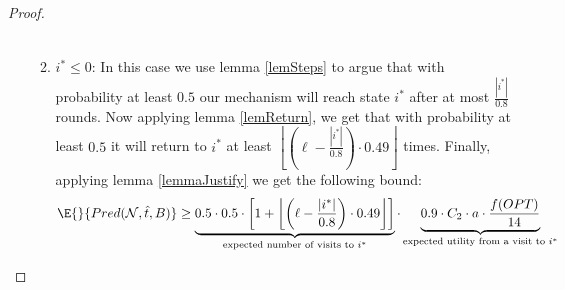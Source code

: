 \begin{proof}
\begin{enumerate}
\begin{enumerate}
\begin{equation}
\begin{split}
                \end{split}
            \end{equation}
            \item $i^* \le 0$:
            In this case we use lemma \ref{lemSteps} to argue that with probability at least $0.5$ our mechanism will reach state $i^*$ after at most $\frac{|i^{*}|}{0.8}$ rounds. Now applying lemma \ref{lemReturn}, we get that with probability at least $0.5$ it will return to $i^*$ at least $\left\lfloor (\ell - \frac{|i^{*}|}{0.8})\cdot 0.49\right\rfloor$ times. Finally, applying lemma \ref{lemmaJustify} we get the following bound:
            \begin{equation}
                \begin{split}
                    \E{}{Pred(\mathcal{N},\hat{t},B)} \ge \underbrace{0.5\cdot 0.5 \cdot \left[1+\left\lfloor \left(\ell - \frac{|i^{*}|}{0.8}\right)\cdot 0.49\right\rfloor \right]}_{\text{expected number of visits to } i^*}\cdot \underbrace{0.9 \cdot C_2 \cdot a \cdot \frac{f(OPT)}{14}}_{\text{expected utility from a visit to }i^*}
                \end{split}
            \end{equation}
        \end{enumerate}
    \end{enumerate}
\end{proof}
